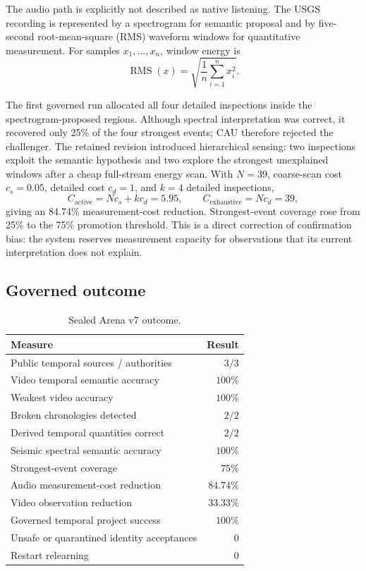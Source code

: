 The audio path is explicitly not described as native listening.  The USGS
recording is represented by a spectrogram for semantic proposal and by
five-second root-mean-square (RMS) waveform windows for quantitative
measurement.  For samples $x_1,\ldots,x_n$, window energy is
\begin{equation}
 \operatorname{RMS}(x)=\sqrt{\frac{1}{n}\sum_{i=1}^{n}x_i^2}.
\end{equation}

The first governed run allocated all four detailed inspections inside the
spectrogram-proposed regions.  Although spectral interpretation was correct,
it recovered only 25\% of the four strongest events; CAU therefore rejected
the challenger.  The retained revision introduced hierarchical sensing:
two inspections exploit the semantic hypothesis and two explore the strongest
unexplained windows after a cheap full-stream energy scan.  With $N=39$,
coarse-scan cost $c_s=0.05$, detailed cost $c_d=1$, and $k=4$ detailed
inspections,
\begin{equation}
 C_{\mathrm{active}}=Nc_s+kc_d=5.95,
 \qquad C_{\mathrm{exhaustive}}=Nc_d=39,
\end{equation}
giving an 84.74\% measurement-cost reduction.  Strongest-event coverage rose
from 25\% to the 75\% promotion threshold.  This is a direct correction of
confirmation bias: the system reserves measurement capacity for observations
that its current interpretation does not explain.

\subsection{Governed outcome}

\begin{table}[ht]
\centering
\small
\begin{tabular}{@{}lr@{}}
\hline
Measure & Result \\
\hline
Public temporal sources / authorities & $3/3$ \\
Video temporal semantic accuracy & $100\%$ \\
Weakest video accuracy & $100\%$ \\
Broken chronologies detected & $2/2$ \\
Derived temporal quantities correct & $2/2$ \\
Seismic spectral semantic accuracy & $100\%$ \\
Strongest-event coverage & $75\%$ \\
Audio measurement-cost reduction & $84.74\%$ \\
Video observation reduction & $33.33\%$ \\
Governed temporal project success & $100\%$ \\
Unsafe or quarantined identity acceptances & $0$ \\
Restart relearning & $0$ \\
\hline
\end{tabular}
\caption{Sealed Arena v7 outcome.}
\end{table}

